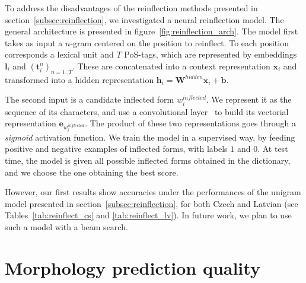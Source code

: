 \documentclass[11pt,letterpaper,final]{article}
\begin{document}
To address the disadvantages of the reinflection methods
presented in section~\ref{subsec:reinflection}, we investigated a neural
reinflection model. The general architecture is presented
 in figure~\ref{fig:reinflection_arch}. The model first takes as input
a $n$-gram centered on the position to reinflect. To each position corresponds
a lexical unit and $T$ PoS-tags, which are represented by embeddings
$\mathbf{l}_{i}$ and $(\mathbf{t}^{n}_{i})_{n=1..T}$.
These are concatenated into a context representation $\mathbf{x}_{i}$
and transformed into a hidden representation 
$\mathbf{h}_{i} = \mathbf{W}^{hidden} \mathbf{x}_{i} + \mathbf{b}$.

The second input is a candidate inflected form $w_{i}^{inflected}$.
We represent it as the sequence of its characters, and use a convolutional
layer~\cite{Santos14Character} to build its vectorial representation $\mathbf{e}_{w_{i}^{inflected}}$.
The product of these two representations goes through
a \emph{sigmoid} activation function. We train the model in a supervised way, by
feeding positive and negative examples of inflected forms, with labels $1$ and $0$. 
At test time, the model is given all possible inflected forms obtained in the 
dictionary, and we choose the one obtaining the best score.

However, our first results show accuracies under the performances of the unigram
model presented in section~\ref{subsec:reinflection}, for both Czech and Latvian (see Tables~\ref{tab:reinflect_cs} and \ref{tab:reinflect_lv}).
In future work, we plan to use such a model with a beam search. %


\section{Morphology prediction quality}
\end{document}
